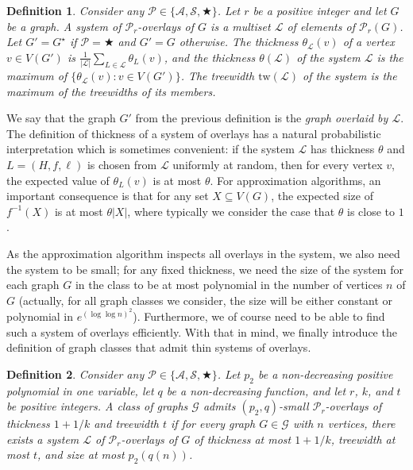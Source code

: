 \documentclass[a4paper,11pt]{article}
\newcommand{\Aa}{{\mathcal A}}
\newcommand{\GG}{{\mathcal G}}
\newcommand{\LL}{{\mathcal L}}
\newcommand{\Ss}{{\mathcal S}}
\newcommand{\PP}{{\mathcal P}}
\newcommand{\tw}{\text{tw}}
\newtheorem{definition}{Definition}
\begin{document}
\begin{definition}\label{def-system}
Consider any $\PP\in\{\Aa,\Ss,\bigstar\}$.
Let $r$ be a positive integer and let $G$ be a graph.
A \emph{system of $\PP_r$-overlays} of $G$ is a multiset $\LL$ of elements of $\PP_r(G)$.
Let $G'=G^\star$ if $\PP=\bigstar$ and $G'=G$ otherwise.
The \emph{thickness} $\theta_{\LL}(v)$ of a vertex $v\in V(G')$ is $\frac{1}{|\LL|}\sum_{L\in\LL}\theta_L(v)$, and
the thickness $\theta(\LL)$ of the system $\LL$ is the maximum of $\{\theta_{\LL}(v):v\in V(G')\}$.
The \emph{treewidth} $\tw(\LL)$ of the system is the maximum of the treewidths of its members.
\end{definition}

We say that the graph $G'$ from the previous definition is the \emph{graph overlaid by $\LL$}.
The definition of thickness of a system of overlays has a natural probabilistic interpretation which is sometimes convenient:
if the system $\LL$ has thickness $\theta$ and $L=(H,f,\ell)$ is chosen from $\LL$ uniformly at random, then for every
vertex $v$, the expected value of $\theta_L(v)$ is at most $\theta$.  For approximation algorithms,
an important consequence is that for any set $X\subseteq V(G)$, the expected size of $f^{-1}(X)$ is
at most $\theta |X|$, where typically we consider the case that $\theta$ is close to $1$.

As the approximation algorithm inspects all overlays in the system, we also need the system to be small;
for any fixed thickness, we need the size of the system for each graph $G$ in the class to be at most
polynomial in the number of vertices $n$ of $G$ (actually, for all graph classes we consider, the size will be either constant
or polynomial in $e^{(\log\log n)^2}$).  Furthermore, we of course need to be able to find such a system of overlays
efficiently.  With that in mind, we finally introduce the definition of graph classes that admit thin systems of overlays.

\begin{definition}\label{def-admit1}
Consider any $\PP\in\{\Aa,\Ss,\bigstar\}$.  Let $p_2$ be a non-decreasing positive polynomial in one variable,
let $q$ be a non-decreasing function, and let $r$, $k$, and $t$ be positive integers.
A class of graphs $\GG$ \emph{admits $(p_2,q)$-small $\PP_r$-overlays of thickness $1+1/k$ and treewidth $t$}
if for every graph $G\in \GG$ with $n$ vertices, there exists a system $\LL$ of $\PP_r$-overlays of $G$
of thickness at most $1+1/k$, treewidth at most $t$, and size at most $p_2(q(n))$.
\end{definition}
\end{document}
